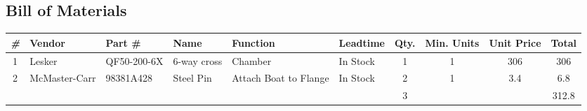 \documentclass[
	a4paper, %
]{ChaosEngineReport}
\begin{document}
\begin{appendices}
\section{Bill of Materials}
\begin{table}[H]
  \centering
  \begin{tabularx}{\textwidth}{cXlXXlcccc}
    \toprule
    \textit{\#} & \textbf{Vendor} & \textbf{Part \#} & \textbf{Name} & \textbf{Function} & \textbf{Leadtime} & \textbf{Qty.} & \textbf{Min. Units} & \textbf{Unit Price} & \textbf{Total} \\
    \midrule
    1           & Lesker          & QF50-200-6X      & 6-way cross   & Chamber               & In Stock          & 1             & 1                   & 306                 & 306            \\
    2           & McMaster-Carr   & 98381A428        & Steel Pin     & Attach Boat to Flange & In Stock          & 2             & 1                   & 3.4                 & 6.8            \\
    \midrule
                &                 &                  &               &                       &                   & 3             &                     &                     & 312.8 \\
    \bottomrule
  \end{tabularx}
\end{table}

\end{appendices}

\end{document}
